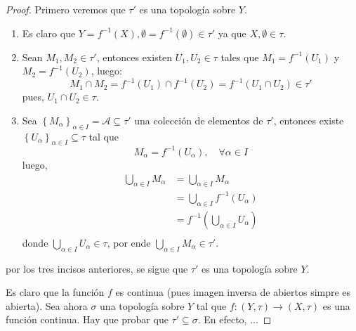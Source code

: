 \documentclass[12pt]{report}
\theoremstyle{largebreak}
\newcommand\cf[3]{\ensuremath{#1:#2\rightarrow#3}}
\begin{document}
    \begin{proof}
        Primero veremos que $\tau'$ es una topología sobre $Y$.
        \begin{enumerate}
            \item Es claro que $Y=f^{-1}(X),\emptyset=f^{-1}(\emptyset)\in\tau'$ ya que $X,\emptyset\in\tau$.
            \item Sean $M_1,M_2\in\tau'$, entonces existen $U_1,U_2\in\tau$ tales que $M_1=f^{-1}(U_1)$ y $M_2=f^{-1}(U_2)$, luego:
            \begin{equation*}
                M_1\cap M_2=f^{-1}(U_1)\cap f^{-1}(U_2)=f^{-1}(U_1\cap U_2)\in\tau'
            \end{equation*}
            pues, $U_1\cap U_2\in\tau$.
            \item  Sea $\left\{M_\alpha \right\}_{\alpha\in I}=\mathcal{A}\subseteq\tau'$ una colección de elementos de $\tau'$, entonces existe $\left\{U_\alpha \right\}_{\alpha\in I}\subseteq \tau$ tal que
            \begin{equation*}
                M_\alpha=f^{-1}(U_\alpha),\quad\forall\alpha\in I
            \end{equation*}
            luego,
            \begin{equation*}
                \begin{split}
                    \bigcup_{\alpha\in I}M_\alpha&=\bigcup_{\alpha\in I}M_\alpha\\
                    &=\bigcup_{\alpha\in I}f^{-1}(U_\alpha)\\
                    &=f^{-1}\left(\bigcup_{\alpha\in I}U_\alpha \right)\\
                \end{split}
            \end{equation*}
            donde $\bigcup_{\alpha\in I}U_\alpha\in\tau$, por ende $\bigcup_{\alpha\in I}M_\alpha\in\tau'$.
        \end{enumerate}
        por los tres incisos anteriores, se sigue que $\tau'$ es una topología sobre $Y$.

        Es claro que la función $f$ es continua (pues imagen inversa de abiertos simpre es abierta). Sea ahora $\sigma$ una topología sobre $Y$ tal que $\cf{f}{(Y,\tau)}{(X,\tau)}$ es una función continua. Hay que probar que $\tau'\subseteq\sigma$. En efecto, ...
    \end{proof}
\end{document}
